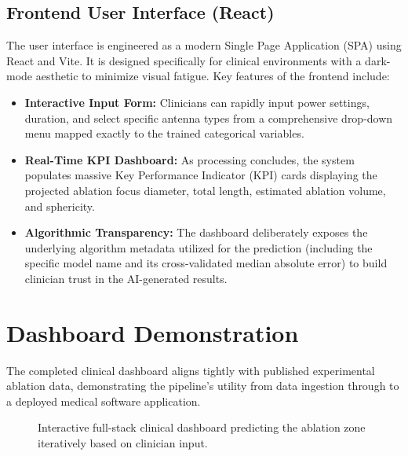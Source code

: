 \subsection{Frontend User Interface (React)}
The user interface is engineered as a modern Single Page Application (SPA) using React and Vite. It is designed specifically for clinical environments with a dark-mode aesthetic to minimize visual fatigue. Key features of the frontend include:
\begin{itemize}
    \item \textbf{Interactive Input Form:} Clinicians can rapidly input power settings, duration, and select specific antenna types from a comprehensive drop-down menu mapped exactly to the trained categorical variables.
    \item \textbf{Real-Time KPI Dashboard:} As processing concludes, the system populates massive Key Performance Indicator (KPI) cards displaying the projected ablation focus diameter, total length, estimated ablation volume, and sphericity. 
    \item \textbf{Algorithmic Transparency:} The dashboard deliberately exposes the underlying algorithm metadata utilized for the prediction (including the specific model name and its cross-validated median absolute error) to build clinician trust in the AI-generated results.
\end{itemize}

\section{Dashboard Demonstration}

The completed clinical dashboard aligns tightly with published experimental ablation data, demonstrating the pipeline's utility from data ingestion through to a deployed medical software application.

\begin{figure}[H]
    \centering
    \vspace{2cm} %
    \caption{Interactive full-stack clinical dashboard predicting the ablation zone iteratively based on clinician input.}
    \label{fig:dashboard}
\end{figure}

